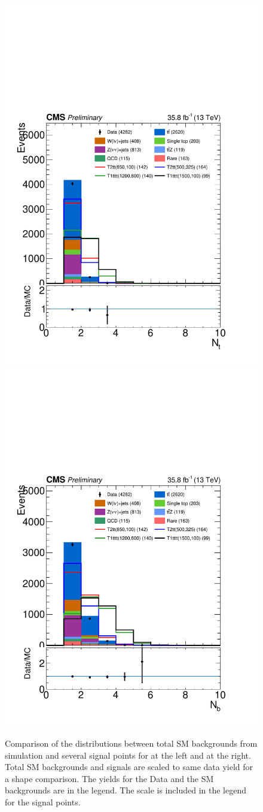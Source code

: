 \begin{figure}[h]
  \begin{center}
    \includegraphics[width=0.45\linewidth]{sections/mc4/EvtSelSBOpt/figures/DataMC_MET_model_NTops_baseline.pdf}
    \includegraphics[width=0.45\linewidth]{sections/mc4/EvtSelSBOpt/figures/DataMC_MET_model_NBJEts_baseline.pdf}\\
    \caption{Comparison of the distributions between total SM backgrounds from simulation and several signal points for \ntops at the left and \nbjets at the right. Total SM backgrounds and signals are scaled to same data yield for a shape comparison. The yields for the Data and the SM backgrounds are in the legend.  The scale is included in the legend for the signal points. }
    \label{fig:compSBvars1}
  \end{center}
\end{figure}


